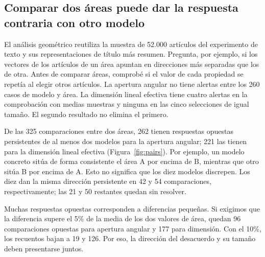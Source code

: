 \documentclass[12pt]{article}
\begin{document}
\FloatBarrier
\subsection{Comparar dos áreas puede dar la respuesta contraria con otro modelo}
El análisis geométrico reutiliza la muestra de 52.000 artículos del experimento de texto y sus representaciones de título más resumen. Pregunta, por ejemplo, si los vectores de los artículos de un área apuntan en direcciones más separadas que los de otra. Antes de comparar áreas, comprobé si el valor de cada propiedad se repetía al elegir otros artículos. La apertura angular no tiene alertas entre los 260 casos de modelo y área. La dimensión lineal efectiva tiene cuatro alertas en la comprobación con medias muestras y ninguna en las cinco selecciones de igual tamaño. El segundo resultado no elimina el primero.

De las 325 comparaciones entre dos áreas, 262 tienen respuestas opuestas persistentes de al menos dos modelos para la apertura angular; 221 las tienen para la dimensión lineal efectiva (Figura~\ref{fig:pairs}). Por ejemplo, un modelo concreto sitúa de forma consistente el área A por encima de B, mientras que otro sitúa B por encima de A. Esto no significa que los diez modelos discrepen. Los diez dan la misma dirección persistente en 42 y 54 comparaciones, respectivamente; las 21 y 50 restantes quedan sin resolver.

Muchas respuestas opuestas corresponden a diferencias pequeñas. Si exigimos que la diferencia supere el 5\% de la media de los dos valores de área, quedan 96 comparaciones opuestas para apertura angular y 177 para dimensión. Con el 10\%, los recuentos bajan a 19 y 126. Por eso, la dirección del desacuerdo y su tamaño deben presentarse juntos.
\end{document}
